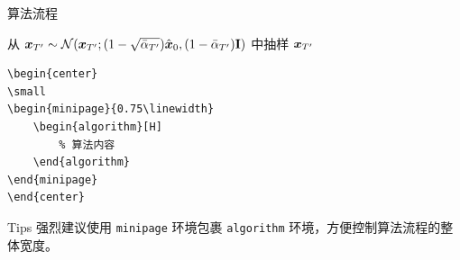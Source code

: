 \begin{frame}{算法流程}
	\begin{center}
		\small
		\begin{minipage}{0.75\linewidth}
			\begin{algorithm}[H]
				\caption{残差噪声扩散模型的推理过程}\label{Resfusion_algorithm_inference}
				从 $\boldsymbol{x}_{T'} \sim \mathcal{N}(\boldsymbol{x}_{T'};(1-\sqrt{\bar{\alpha}_{T'}})\hat{\boldsymbol{x}}_0,(1-\bar{\alpha}_{T'})\boldsymbol{\mathrm{I}})$ 中抽样 $\boldsymbol{x}_{T'}$ \;
				
			\end{algorithm}
		\end{minipage}
	\end{center}
\begin{lstlisting}
\begin{center}
\small
\begin{minipage}{0.75\linewidth}
    \begin{algorithm}[H]
        % 算法内容
    \end{algorithm}
\end{minipage}
\end{center}
\end{lstlisting}
	\vspace*{0.5cm}
	\begin{block}{Tips}
		强烈建议使用 \texttt{minipage} 环境包裹 \texttt{algorithm} 环境，方便控制算法流程的整体宽度。
	\end{block}
\end{frame}


